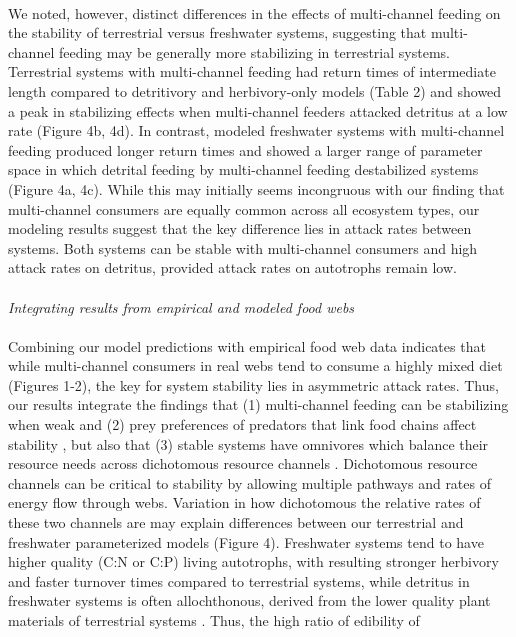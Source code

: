 \documentclass[12pt,a4paper,oneside]{article}
\begin{document}
\\
\indent We noted, however, distinct differences in the effects of multi-channel feeding on
the stability of terrestrial versus freshwater systems, suggesting that
multi-channel feeding may be generally more stabilizing in terrestrial
systems. Terrestrial systems with multi-channel feeding had return times of intermediate length compared to detritivory and herbivory-only models (Table 2) and showed a peak in stabilizing effects when multi-channel feeders attacked detritus at a low rate (Figure 4b, 4d). In contrast, modeled freshwater systems with multi-channel feeding produced longer return times and showed a larger range of parameter space in which detrital feeding by multi-channel feeding destabilized systems (Figure 4a, 4c). While this may initially seems incongruous with our finding that
multi-channel consumers are equally common across all ecosystem types,
our modeling results suggest that the 
key difference lies in attack rates between systems. Both systems
can be stable with multi-channel consumers and high attack rates on
detritus, provided attack rates on
autotrophs remain low.
\\
\\
\noindent \emph{Integrating results from empirical and modeled food webs}\\
\\
\indent Combining our model
predictions with empirical food web data indicates that while
multi-channel consumers in real webs tend to consume a highly mixed
diet (Figures 1-2), the key for system stability lies in asymmetric
attack rates. Thus, our results integrate the findings that (1) multi-channel feeding can be
stabilizing when weak \citep{McCann:1998} and (2) prey preferences of predators that link food chains affect stability \citep{Post:2000xx}, but also that (3) stable systems have omnivores
which balance their resource needs across dichotomous resource
channels \citep{Rooney:2006}. Dichotomous resource channels can be
critical to stability by allowing multiple pathways and rates of
energy flow through webs. Variation in how dichotomous 
the relative rates of these two channels are may explain differences between
our terrestrial and freshwater parameterized models (Figure 4). Freshwater systems
tend to have higher quality (C:N or C:P) living autotrophs, with
resulting stronger herbivory and faster turnover
times compared to terrestrial systems, while detritus in freshwater
systems is often allochthonous, derived from the lower
quality plant materials of terrestrial systems
\citep{Cebrian:2004}. Thus, the high ratio of edibility of
\end{document}
